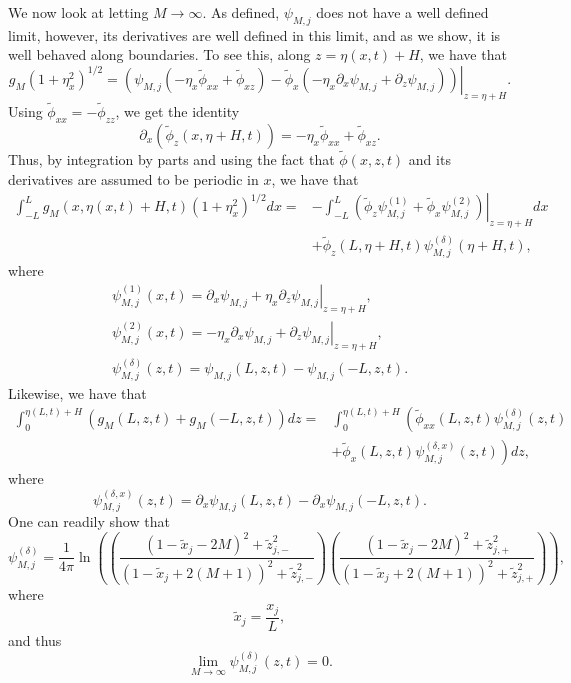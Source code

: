 \documentclass[a4paper,11pt]{article}
\newcommand{\p}{\partial}
\begin{document}
We now look at letting $M\rightarrow\infty$.  As defined, $\psi_{M,j}$ does not have a well defined limit, however, its derivatives are well defined in this limit, and as we show, it is well behaved along boundaries.  To see this, along $z = \eta(x,t) + H$, we have that 
\[
g_{M}(1+\eta_{x}^{2})^{1/2} = \left.\left(\psi_{M,j}\left(- \eta_{x}\tilde{\phi}_{xx}+\tilde{\phi}_{xz}\right)-\tilde{\phi}_{x}\left(-\eta_{x}\p_{x}\psi_{M,j}+\p_{z}\psi_{M,j}\right) \right)\right|_{z= \eta+H}.
\]
Using $\tilde{\phi}_{xx} = -\tilde{\phi}_{zz}$, we get the identity
\[
\p_{x}\left(\tilde{\phi}_{z}(x, \eta+H,t) \right) = -\eta_{x}\tilde{\phi}_{xx} + \tilde{\phi}_{xz}.
\]
Thus, by integration by parts and using the fact that $\tilde{\phi}(x,z,t)$ and its derivatives are assumed to be periodic in $x$, we have that 
\begin{align*}
\int_{-L}^{L}g_{M}(x,\eta(x,t)+H,t) (1+\eta_{x}^{2})^{1/2}dx = & -\int_{-L}^{L} \left.\left(\tilde{\phi}_{z}\psi^{(1)}_{M,j}+\tilde{\phi}_{x}\psi^{(2)}_{M,j}\right)\right|_{z=\eta+H}dx \\
& + \tilde{\phi}_{z}(L,\eta+H,t)\psi^{(\delta)}_{M,j}(\eta+H,t),
\end{align*}
where
\begin{align*}
\psi^{(1)}_{M,j}(x,t) = \left.\p_{x}\psi_{M,j}+ \eta_{x}\p_{z}\psi_{M,j}\right|_{z=\eta+H}, \\
\psi^{(2)}_{M,j}(x,t) = \left.-\eta_{x}\p_{x}\psi_{M,j} + \p_{z}\psi_{M,j}\right|_{z=\eta+H}, \\
\psi^{(\delta)}_{M,j}(z,t) = \psi_{M,j}(L,z,t)-\psi_{M,j}(-L,z,t).
\end{align*}
Likewise, we have that 
\begin{align*}
\int_{0}^{\eta(L,t)+H} \left(g_{M}(L,z,t) + g_{M}(-L,z,t)\right) dz = & \int_{0}^{\eta(L,t)+H} \left(\tilde{\phi}_{xx}(L,z,t)\psi^{(\delta)}_{M,j}(z,t) \right.  \\
&\left. + \tilde{\phi}_{x}(L,z,t)\psi^{(\delta,x)}_{M,j}(z,t) \right) dz, 
\end{align*}
where
\[
\psi^{(\delta,x)}_{M,j}(z,t) = \p_{x}\psi_{M,j}(L,z,t)-\p_{x}\psi_{M,j}(-L,z,t). 
\]
One can readily show that 
\[
\psi_{M,j}^{(\delta)} = \frac{1}{4\pi}\ln\left(\left(\frac{(1-\tilde{x}_{j}-2M)^{2}+\tilde{z}_{j,-}^{2}}{(1-\tilde{x}_{j}+2(M+1))^{2}+\tilde{z}_{j,-}^{2}}\right) \left(\frac{(1-\tilde{x}_{j}-2M)^{2}+\tilde{z}_{j,+}^{2}}{(1-\tilde{x}_{j}+2(M+1))^{2}+\tilde{z}_{j,+}^{2}}\right) \right),
\]
where
\[
\tilde{x}_{j} = \frac{x_{j}}{L},
\]
and thus 
\[
\lim_{M\rightarrow\infty}\psi_{M,j}^{(\delta)}(z,t) = 0.
\]
\end{document}
